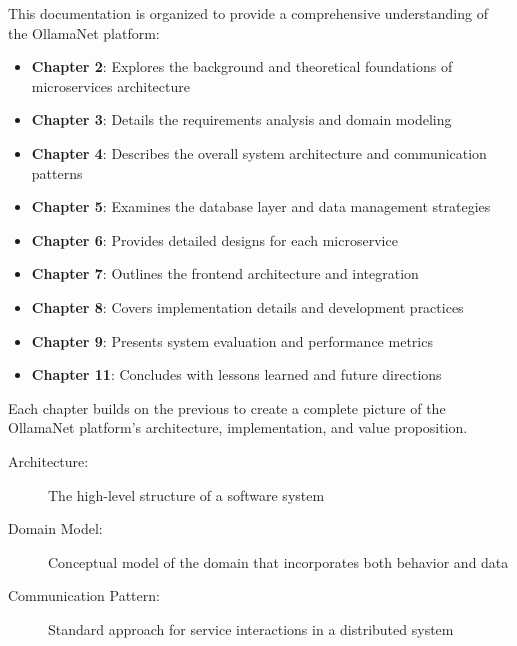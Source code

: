 This documentation is organized to provide a comprehensive understanding of the OllamaNet platform:

\begin{itemize}
    \item \textbf{Chapter 2}: Explores the background and theoretical foundations of microservices architecture
    \item \textbf{Chapter 3}: Details the requirements analysis and domain modeling
    \item \textbf{Chapter 4}: Describes the overall system architecture and communication patterns
    \item \textbf{Chapter 5}: Examines the database layer and data management strategies
    \item \textbf{Chapter 6}: Provides detailed designs for each microservice
    \item \textbf{Chapter 7}: Outlines the frontend architecture and integration
    \item \textbf{Chapter 8}: Covers implementation details and development practices
    \item \textbf{Chapter 9}: Presents system evaluation and performance metrics
    \item \textbf{Chapter 11}: Concludes with lessons learned and future directions
\end{itemize}

Each chapter builds on the previous to create a complete picture of the OllamaNet platform's architecture, implementation, and value proposition.

\begin{terminology}
\begin{description}
    \item[Architecture:] The high-level structure of a software system
    \item[Domain Model:] Conceptual model of the domain that incorporates both behavior and data
    \item[Communication Pattern:] Standard approach for service interactions in a distributed system
\end{description}
\end{terminology}





